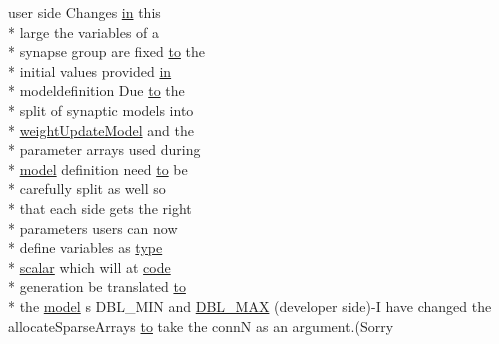 \begin{DoxyCompactItemize}
\item 
user side Changes \hyperlink{README_8txt_a148897a6b2cc9cff25af80abb13426b0}{in} this \\*
large the variables of a \\*
synapse group are fixed \hyperlink{README_8txt_add1f2ee32acc15ef77f839d4382c9768}{to} the \\*
initial values provided \hyperlink{README_8txt_a148897a6b2cc9cff25af80abb13426b0}{in} \\*
modeldefinition Due \hyperlink{README_8txt_add1f2ee32acc15ef77f839d4382c9768}{to} the \\*
split of synaptic models into \\*
\hyperlink{classweightUpdateModel}{weight\+Update\+Model} and the \\*
parameter arrays used during \\*
\hyperlink{README_8txt_a69fd801b7213948c12d9dd7eebb3ed14}{model} definition need \hyperlink{README_8txt_add1f2ee32acc15ef77f839d4382c9768}{to} be \\*
carefully split as well so \\*
that each side gets the right \\*
parameters users can now \\*
define variables as \hyperlink{userproject_2PoissonIzh__project_2README_8txt_a18700dbf29429942d4c3eda1e02fdef7}{type} \\*
\hyperlink{gen__input__structured_8cc_a6d99cd2efc6cbd8f720384a7444ed035}{scalar} which will at \hyperlink{userproject_2MBody__userdef__project_2README_8txt_aeec4e596748e7c29dd5548dae4c70685}{code} \\*
generation be translated \hyperlink{README_8txt_add1f2ee32acc15ef77f839d4382c9768}{to} \\*
the \hyperlink{README_8txt_a69fd801b7213948c12d9dd7eebb3ed14}{model} s D\+B\+L\+\_\+\+M\+I\+N and \hyperlink{changesSummary_8txt_a37527189fbad73cd7626959b133fa6e9}{D\+B\+L\+\_\+\+M\+A\+X} (developer side)-\/I have changed the allocate\+Sparse\+Arrays \hyperlink{README_8txt_add1f2ee32acc15ef77f839d4382c9768}{to} take the conn\+N as an argument.(Sorry
\end{DoxyCompactItemize}
